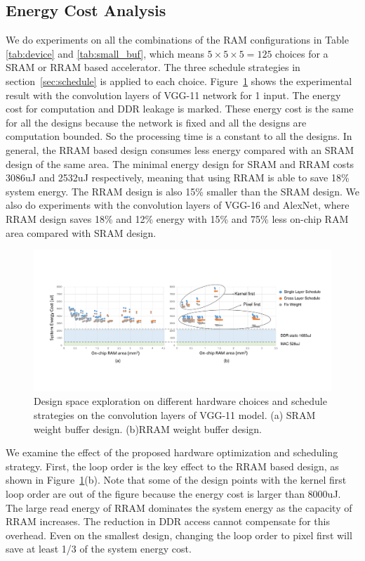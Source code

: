 \subsection{Energy Cost Analysis}
We do experiments on all the combinations of the RAM configurations in Table \ref{tab:device} and \ref{tab:small_buf}, which means $5\times 5\times 5 = 125$ choices for a SRAM or RRAM based accelerator. The three schedule strategies in section~\ref{sec:schedule} is applied to each choice. Figure~\ref{fig:design_space} shows the experimental result with the convolution layers of VGG-11 network for 1 input. The energy cost for computation and DDR leakage is marked. These energy cost is the same for all the designs because the network is fixed and all the designs are computation bounded. So the processing time is a constant to all the designs. In general, the RRAM based design consumes less energy compared with an SRAM design of the same area. The minimal energy design for SRAM and RRAM costs 3086uJ and 2532uJ respectively, meaning that using RRAM is able to save 18\% system energy. The RRAM design is also 15\% smaller than the SRAM design. We also do experiments with the convolution layers of VGG-16 and AlexNet, where RRAM design saves 18\% and 12\% energy with 15\% and 75\% less on-chip RAM area compared with SRAM design.

\begin{figure}[t]
  \centering
  \includegraphics[width=2\columnwidth]{fig/design_space.pdf}
  \vspace{-10pt}
  \caption{Design space exploration on different hardware choices and schedule strategies on the convolution layers of VGG-11 model. (a) SRAM weight buffer design. (b)RRAM weight buffer design.}
  \label{fig:design_space}
  \vspace{-5pt}
\end{figure}

We examine the effect of the proposed hardware optimization and scheduling strategy. First, the loop order is the key effect to the RRAM based design, as shown in Figure~\ref{fig:design_space}(b). Note that some of the design points with the kernel first loop order are out of the figure because the energy cost is larger than 8000uJ. The large read energy of RRAM dominates the system energy as the capacity of RRAM increases. The reduction in DDR access cannot compensate for this overhead. Even on the smallest design, changing the loop order to pixel first will save at least 1/3 of the system energy cost. 

